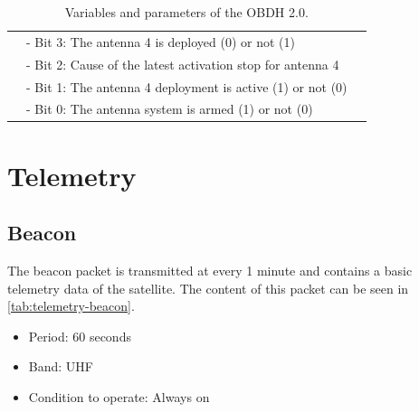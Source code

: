 \begin{table}[!h]
\begin{tabular}{cL{0.82\textwidth}l}
            & - Bit 3: The antenna 4 is deployed (0) or not (1)       &        \\
            & - Bit 2: Cause of the latest activation stop for antenna 4 &     \\
            & - Bit 1: The antenna 4 deployment is active (1) or not (0) &     \\
            & - Bit 0: The antenna system is armed (1) or not (0)     &        \\
        \bottomrule[1.5pt]
    \end{tabular}
    \caption{Variables and parameters of the OBDH 2.0.}
    \label{tab:vars-and-pars}
\end{table}

\section{Telemetry}


\subsection{Beacon}

The beacon packet is transmitted at every 1 minute and contains a basic telemetry data of the satellite. The content of this packet can be seen in \autoref{tab:telemetry-beacon}.

\begin{itemize}
    \item Period: 60 seconds
    \item Band: UHF
    \item Condition to operate: Always on
\end{itemize}

